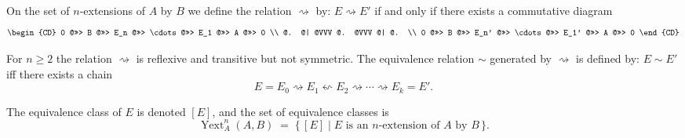On the set of $n$-extensions of $A$ by $B$ we define the relation $\rightsquigarrow$ by: $E \rightsquigarrow E'$ if and only if there exists a commutative diagram
$$
\begin{CD}
0 @>>> B @>>> E_n @>>> \cdots @>>> E_1 @>>> A @>>> 0 \\
    @. @| @VVV              @. @VVV         @| @. \\
0 @>>> B @>>> E_n' @>>> \cdots @>>> E_1' @>>> A @>>> 0
\end{CD}
$$

For $n \geq 2$ the relation $\rightsquigarrow$ is reflexive and transitive but not symmetric. The equivalence relation $\sim$ generated by $\rightsquigarrow$ is defined by: $E \sim E'$ iff there exists a chain
$$
E = E_0 \rightsquigarrow E_1 \leftsquigarrow E_2 \rightsquigarrow \cdots \rightsquigarrow E_k = E'.
$$

The equivalence class of $E$ is denoted $[E]$, and the set of equivalence classes is
$$
\operatorname{Yext}_A^n(A, B) \;=\; \{\, [E] \mid E \text{ is an $n$-extension of $A$ by $B$} \,\}.
$$
